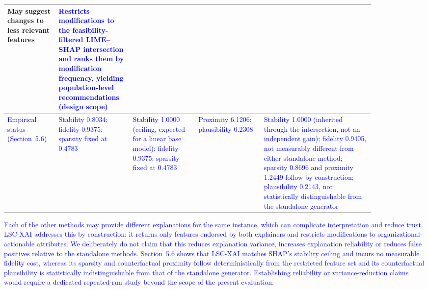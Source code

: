 \documentclass[a4paper,fleqn]{cas-sc}
\begin{document}
\begin{table}[width=1\linewidth,cols=5,pos=H]
\begin{tabular*}{\tblwidth}{p{0.12\linewidth}p{0.16\linewidth}p{0.16\linewidth}p{0.16\linewidth}p{0.27\linewidth}}
May suggest changes to less relevant features &  \textcolor{blue}{Restricts modifications to the feasibility-filtered LIME--SHAP intersection and ranks them by modification frequency, yielding population-level recommendations (design scope)}
\\\hline
\textcolor{blue}{Empirical status (Section~5.6)} & \textcolor{blue}{Stability 0.8034; fidelity 0.9375; sparsity fixed at 0.4783} & \textcolor{blue}{Stability 1.0000 (ceiling, expected for a linear base model); fidelity 0.9375; sparsity fixed at 0.4783} & \textcolor{blue}{Proximity 6.1206; plausibility 0.2308} & \textcolor{blue}{Stability 1.0000 (inherited through the intersection, not an independent gain); fidelity 0.9405, not measurably different from either standalone method; sparsity 0.8696 and proximity 1.2449 follow by construction; plausibility 0.2143, not statistically distinguishable from the standalone generator} \\\hline
\end{tabular*}
\end{table}
\textcolor{blue}{Each of the other methods may provide different explanations for the same instance, which can complicate interpretation and reduce trust. LSC-XAI addresses this by construction: it returns only features endorsed by both explainers and restricts modifications to organizational-actionable attributes. We deliberately do not claim that this reduces explanation variance, increases explanation reliability or reduces false positives relative to the standalone methods. Section~5.6 shows that LSC-XAI matches SHAP's stability ceiling and incurs no measurable fidelity cost, whereas its sparsity and counterfactual proximity follow deterministically from the restricted feature set and its counterfactual plausibility is statistically indistinguishable from that of the standalone generator. Establishing reliability or variance-reduction claims would require a dedicated repeated-run study beyond the scope of the present evaluation.}
\end{document}
